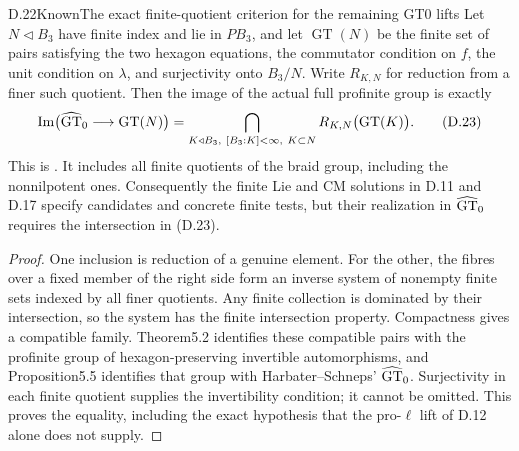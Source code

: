 \begin{statement}{D.22}{Known}{The exact finite-quotient criterion for the remaining GT0 lifts}
Let $N\triangleleft B_3$ have finite index and lie in $PB_3$, and let $\operatorname{GT}(N)$ be the finite set of pairs satisfying the two hexagon equations, the commutator condition on $f$, the unit condition on $\lambda$, and surjectivity onto $B_3/N$. Write $R_{K,N}$ for reduction from a finer such quotient. Then the image of the actual full profinite group is exactly
\[
 \operatorname{Im}\bigl(\widehat{\rm GT}_0\longrightarrow\operatorname{GT}(N)\bigr)
   =\bigcap_{K\triangleleft B_3,\ [B_3:K]<\infty,\ K\subset N}
          R_{K,N}\bigl(\operatorname{GT}(K)\bigr).             \tag{D.23}
\]
This is \cite[Theorem5.2, Corollary5.4 and Proposition5.5]{dDolgushevGuynee2024}. It includes all finite quotients of the braid group, including the nonnilpotent ones. Consequently the finite Lie and CM solutions in D.11 and D.17 specify candidates and concrete finite tests, but their realization in $\widehat{\rm GT}_0$ requires the intersection in (D.23).
\end{statement}
\begin{proof}
One inclusion is reduction of a genuine element. For the other, the fibres over a fixed member of the right side form an inverse system of nonempty finite sets indexed by all finer quotients. Any finite collection is dominated by their intersection, so the system has the finite intersection property. Compactness gives a compatible family. Theorem5.2 identifies these compatible pairs with the profinite group of hexagon-preserving invertible automorphisms, and Proposition5.5 identifies that group with Harbater--Schneps' $\widehat{\rm GT}_0$. Surjectivity in each finite quotient supplies the invertibility condition; it cannot be omitted. This proves the equality, including the exact hypothesis that the pro-$\ell$ lift of D.12 alone does not supply.
\end{proof}

